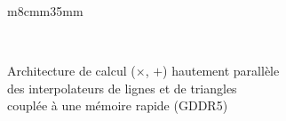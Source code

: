\begin{frame}
\begin{center}
\begin{tabular}{m{8cm}m{35mm}}
    \end{tabular} \\
    \begin{minipage}{.7\linewidth}
      Architecture de calcul ($\times$, $+$) hautement parallèle \\
      des interpolateurs de lignes et de triangles \\
      couplée à une mémoire rapide (GDDR5)
    \end{minipage}
  \end{center}
\end{frame}

